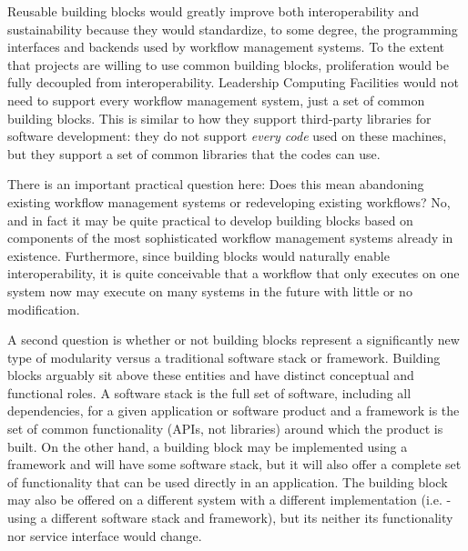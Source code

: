 Reusable building blocks would greatly improve both interoperability and
sustainability because they would standardize, to some degree, the programming
interfaces and backends used by workflow management systems. To the extent that
projects are willing to use common building blocks, proliferation would be fully
decoupled from interoperability. Leadership Computing Facilities would not need
to support every workflow management system, just a set of common building
blocks. This is similar to how they support third-party libraries for software
development: they do not support \textit{every code} used on these machines, but
they support a set of common libraries that the codes can use. 

There is an important practical question here: Does this mean abandoning
existing workflow management systems or redeveloping existing workflows? No, and
in fact it may be quite practical to develop building blocks based on components
of the most sophisticated workflow management systems already in existence.
Furthermore, since building blocks would naturally enable interoperability, it
is quite conceivable that a workflow that only executes on one system now may
execute on many systems in the future with little or no modification. 

A second question is whether or not building blocks represent a significantly new
type of modularity versus a traditional software stack or framework. Building blocks
arguably sit above these entities and have distinct conceptual and functional roles.
A software stack is the full set of software, including all dependencies, for a given
application or software product and a framework is the set of common functionality
(APIs, not libraries) around which the product is built. On the other hand, a
building block may be implemented using a framework and will have some software stack,
but it will also offer a complete set of functionality that can be used directly in
an application. The building block may also be offered on a different system with a
different implementation (i.e. - using a different software stack and framework), but
its neither its functionality nor service interface would change.